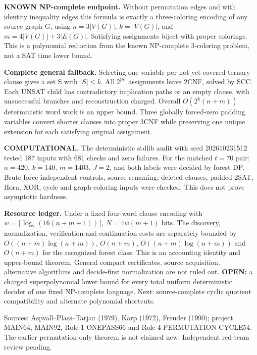 \documentclass{article}
\begin{document}
\textbf{KNOWN NP-complete endpoint.}
Without permutation edges and with identity inequality edges this formula is exactly a three-coloring encoding of any source graph G, using $n=3|V(G)|$, $k=|V(G)|$, and $m=4|V(G)|+3|E(G)|$. Satisfying assignments biject with proper colorings. This is a polynomial reduction from the known NP-complete 3-coloring problem, not a SAT time lower bound.

\textbf{Complete general fallback.}
Selecting one variable per not-yet-covered ternary clause gives a set S with $|S|\le k$. All $2^{|S|}$ assignments leave 2CNF, solved by SCC. Each UNSAT child has contradictory implication paths or an empty clause, with unsuccessful branches and reconstruction charged. Overall $O(2^k(n+m))$ deterministic word work is an upper bound. Three globally forced-zero padding variables convert shorter clauses into proper 3CNF while preserving one unique extension for each satisfying original assignment.

\textbf{COMPUTATIONAL.}
The deterministic stdlib audit with seed 202610231512 tested 187 inputs with 681 checks and zero failures. For the matched $t=70$ pair: $n=420$, $k=140$, $m=1403$, $J=2$, and both labels were decided by forest DP. Brute-force independent controls, source renaming, deleted clauses, padded 2SAT, Horn, XOR, cycle and graph-coloring inputs were checked. This does not prove asymptotic hardness.

\textbf{Resource ledger.}
Under a fixed four-word clause encoding with $w=\lceil\log_2(16(n+m+1))\rceil$, $N=4w(m+1)$ bits. The discovery, normalization, verification and continuation costs are separately bounded by $O((n+m)\log(n+m))$, $O(n+m)$, $O((n+m)\log(n+m))$ and $O(n+m)$ for the recognized forest class. This is an accounting identity and upper-bound theorem. General compact certificates, source acquisition, alternative algorithms and decide-first normalization are not ruled out.
\textbf{OPEN:} a charged superpolynomial lower bound for every total uniform deterministic decider of one fixed NP-complete language. Next: source-complete cyclic quotient compatibility and alternate polynomial shortcuts.

Sources: Aspvall--Plass--Tarjan (1979), Karp (1972), Freuder (1990); project MAIN64, MAIN92, Role-1 ONEPASS66 and Role-4 PERMUTATION-CYCLE54. The earlier permutation-only theorem is not claimed new. Independent red-team review pending.
\end{document}
